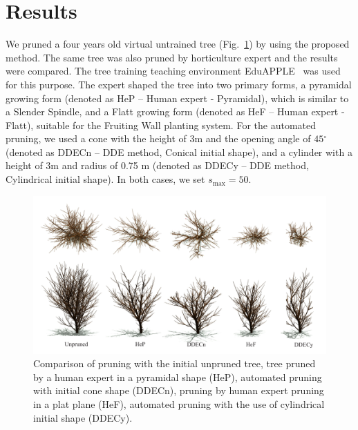 
\section{Results}
We pruned a four years old virtual
untrained tree (Fig.~\ref{fig:my_figure4}) by using the proposed method. The same tree was also pruned by horticulture expert and the results were compared.
The tree training teaching environment EduAPPLE~\cite{kohek_eduapple:_2015} was used for this purpose. The expert shaped the tree into two primary forms, a
pyramidal growing form (denoted as HeP -- Human expert - Pyramidal), which is similar to a Slender Spindle, and a
Flatt growing form (denoted as HeF -- Human expert - Flatt), suitable for the Fruiting Wall planting system. 
For the automated pruning, we used a cone with the height of \(3\)m and the
opening angle of \(45{^\circ}\) (denoted as DDECn -- DDE method, Conical initial shape), and a cylinder with a height of
3m and radius of 0.75 m (denoted as DDECy -- DDE method, Cylindrical initial shape). 
In both cases, we set \(s_{\mathrm{\max}}=50\). 
\begin{figure}[hbt]
    \centering
    \includegraphics[width=\linewidth]{figs/Fig5.pdf}
    \caption{Comparison of pruning with the initial unpruned tree,
tree pruned by a human expert in a pyramidal shape (HeP), automated
pruning with initial cone shape (DDECn), pruning by human expert pruning
in a plat plane (HeF), automated pruning with the use of cylindrical
initial shape (DDECy).}
    \label{fig:my_figure4}
\end{figure}

